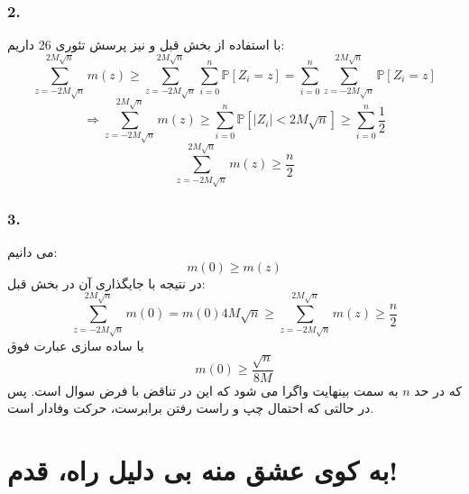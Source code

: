\documentclass[]{article}
\begin{document}
 \subsubsection{2.}
 با استفاده از بخش قبل و نیز پرسش تئوری 26 داریم:
 \begin{equation}
 	\nonumber
 	\sum_{z=-2M\sqrt{n}}^{2M\sqrt{n}} m(z) \geqslant \sum_{z=-2M\sqrt{n}}^{2M\sqrt{n}} \sum_{i = 0}^{n} \mathbb{P}[Z_i = z] =\sum_{i = 0}^{n} \sum_{z=-2M\sqrt{n}}^{2M\sqrt{n}} \mathbb{P}[Z_i = z]
 \end{equation}
 \begin{equation}
 	\nonumber
 	\Rightarrow \sum_{z=-2M\sqrt{n}}^{2M\sqrt{n}} m(z) \geqslant \sum_{i = 0}^{n} \mathbb{P}[|Z_i| < 2M\sqrt{n}] \geqslant \sum_{i = 0}^{n} \frac{1}{2}
 \end{equation}
 \begin{equation}
 	\nonumber
 	\sum_{z=-2M\sqrt{n}}^{2M\sqrt{n}} m(z) \geqslant \frac{n}{2}
 \end{equation}
 \subsubsection{3.}
 می دانیم:
 \begin{equation}
 	\nonumber
 	m(0) \geqslant m(z)
 \end{equation}
 در نتیجه با جایگذاری آن در بخش قبل:
 \begin{equation}
 	\nonumber
 	\sum_{z = -2M\sqrt{n}}^{2M\sqrt{n}} m(0) = m(0) 4M\sqrt{n} \geqslant \sum_{z = -2M\sqrt{n}}^{2M\sqrt{n}} m(z) \geqslant \frac{n}{2}
 \end{equation}
 با ساده سازی عبارت فوق 
 \begin{equation}
 	\nonumber
 	m(0) \geqslant \frac{\sqrt{n}}{8M}
 \end{equation}
 که در حد 
 $n$
 به سمت بینهایت واگرا می شود که این در تناقض با فرض سوال است. پس در حالتی که احتمال چپ و راست رفتن برابرست، حرکت وفادار است.
\newpage
\section{به کوی عشق منه بی دلیل راه، قدم!}
\end{document}
